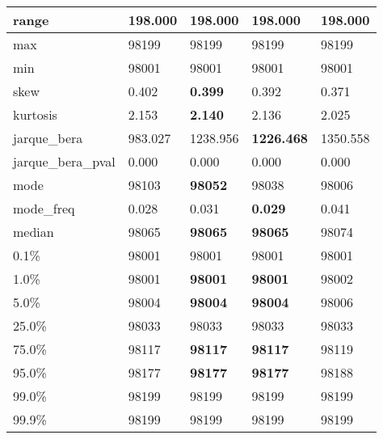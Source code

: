 \begin{table}[H]
\begin{tabular}{|l|m{10em}|m{10em}|m{10em}|m{10em}|}
\hline range & 198.000 & 198.000 & 198.000 & 198.000 \\
\hline max & 98199 & 98199 & 98199 & 98199 \\
\hline min & 98001 & 98001 & 98001 & 98001 \\
\hline skew & 0.402 & \bfseries 0.399 & 0.392 & \cellcolor[rgb]{0.9, 0.54, 0.52} 0.371 \\
\hline kurtosis & 2.153 & \bfseries 2.140 & 2.136 & \cellcolor[rgb]{0.9, 0.54, 0.52} 2.025 \\
\hline jarque\_bera & 983.027 & 1238.956 & \bfseries 1226.468 & \cellcolor[rgb]{0.9, 0.54, 0.52} 1350.558 \\
\hline jarque\_bera\_pval & 0.000 & 0.000 & 0.000 & 0.000 \\
\hline mode & 98103 & \bfseries 98052 & 98038 & \cellcolor[rgb]{0.9, 0.54, 0.52} 98006 \\
\hline mode\_freq & 0.028 & 0.031 & \bfseries 0.029 & \cellcolor[rgb]{0.9, 0.54, 0.52} 0.041 \\
\hline median & 98065 & \bfseries 98065 & \bfseries 98065 & \cellcolor[rgb]{0.9, 0.54, 0.52} 98074 \\
\hline 0.1\% & 98001 & 98001 & 98001 & 98001 \\
\hline 1.0\% & 98001 & \bfseries 98001 & \bfseries 98001 & \cellcolor[rgb]{0.9, 0.54, 0.52} 98002 \\
\hline 5.0\% & 98004 & \bfseries 98004 & \bfseries 98004 & \cellcolor[rgb]{0.9, 0.54, 0.52} 98006 \\
\hline 25.0\% & 98033 & 98033 & 98033 & 98033 \\
\hline 75.0\% & 98117 & \bfseries 98117 & \bfseries 98117 & \cellcolor[rgb]{0.9, 0.54, 0.52} 98119 \\
\hline 95.0\% & 98177 & \bfseries 98177 & \bfseries 98177 & \cellcolor[rgb]{0.9, 0.54, 0.52} 98188 \\
\hline 99.0\% & 98199 & 98199 & 98199 & 98199 \\
\hline 99.9\% & 98199 & 98199 & 98199 & 98199 \\
\hline
\end{tabular}
\end{table}
